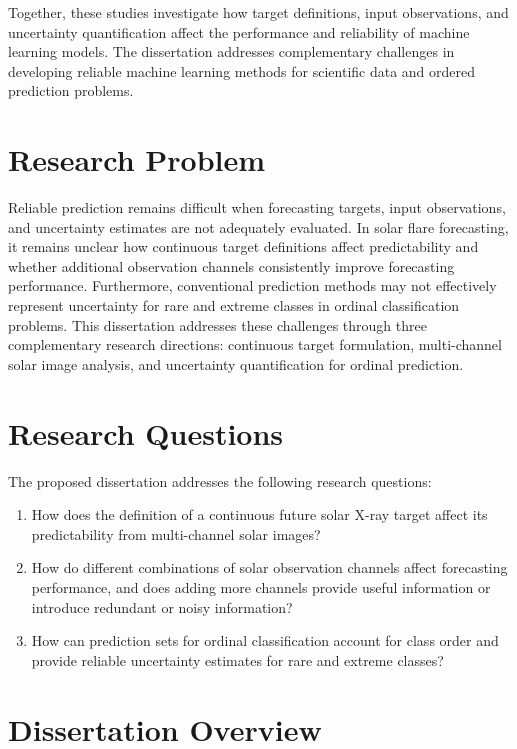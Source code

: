 \documentclass[12pt]{report}
\begin{document}
Together, these studies investigate how target definitions, input observations, and uncertainty quantification affect the performance and reliability of machine learning models. The dissertation addresses complementary challenges in developing reliable machine learning methods for scientific data and ordered prediction problems.

\section{Research Problem}

Reliable prediction remains difficult when forecasting targets, input observations, and uncertainty estimates are not adequately evaluated. In solar flare forecasting, it remains unclear how continuous target definitions affect predictability and whether additional observation channels consistently improve forecasting performance. Furthermore, conventional prediction methods may not effectively represent uncertainty for rare and extreme classes in ordinal classification problems. This dissertation addresses these challenges through three complementary research directions: continuous target formulation, multi-channel solar image analysis, and uncertainty quantification for ordinal prediction.

\section{Research Questions}

The proposed dissertation addresses the following research questions:

\begin{enumerate}[label=\textbf{RQ\arabic*:}]
    \item How does the definition of a continuous future solar X-ray target affect its predictability from multi-channel solar images?

    \item How do different combinations of solar observation channels affect forecasting performance, and does adding more channels provide useful information or introduce redundant or noisy information?

    \item How can prediction sets for ordinal classification account for class order and provide reliable uncertainty estimates for rare and extreme classes?
\end{enumerate}

\section{Dissertation Overview}
\end{document}
